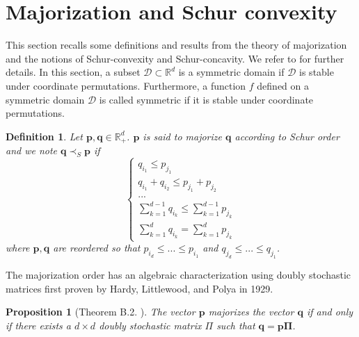 \documentclass[twoside,11pt]{book}
\newtheorem{proposition}{Proposition}
\newtheorem{definition}{Definition}
\numberwithin{theorem}{chapter}
\numberwithin{definition}{chapter}
\numberwithin{proposition}{chapter}
\numberwithin{corollary}{chapter}
\numberwithin{example}{chapter}
\numberwithin{lemma}{chapter}
\begin{document}
\section{Majorization and Schur convexity}
\label{app:majorization}


This section recalls some definitions and results from the theory of majorization and the notions of Schur-convexity and Schur-concavity. We refer to \citep{MaOlAr11} for further details. In this section, a subset $\mathcal{D} \subset \mathbb{R}^{d}$ is a symmetric domain if $\mathcal{D}$ is stable under coordinate permutations. Furthermore, a function $f$ defined on a symmetric domain $\mathcal{D}$ is called symmetric if it is stable under coordinate permutations.

\begin{definition}\label{def:majorization}
Let $\bm{p},\bm{q} \in \mathbb{R}_{+}^{d}$. $\bm{p}$ is said to majorize $\bm{q}$ according to Schur order and we note $\bm{q} \prec_{S} \bm{p}$ if
\begin{equation}
\left\{
    \begin{array}{ll}
        q_{i_{1}} \leq p_{j_{1}} \\
        q_{i_{1}} + q_{i_{2}} \leq p_{j_{1}} + p_{j_{2}} \\
        ... \\
        \sum\limits_{k=1}^{d-1} q_{i_{k}} \leq \sum\limits_{k=1}^{d-1} p_{j_{k}}\\
        \sum\limits_{k=1}^{d} q_{i_{k}} = \sum\limits_{k=1}^{d} p_{j_{k}}
    \end{array}
\right.
\end{equation}
where $\bm{p},\bm{q}$ are reordered so that $p_{i_{d}} \leq ... \leq p_{i_{1}}$ and $q_{j_{d}} \leq ... \leq q_{j_{1}}$.
\end{definition}
The majorization order has an algebraic characterization using doubly stochastic matrices first proven by Hardy, Littlewood, and Polya in 1929.
\begin{proposition}[Theorem B.2. \citealp{MaOlAr11}]
The vector $\bm{p}$ majorizes the vector $\bm{q}$ if and only if there exists a $d \times d$ doubly stochastic matrix $\Pi$ such that $\bm{q} = \bm{p \Pi}$.
\end{proposition}
\end{document}
